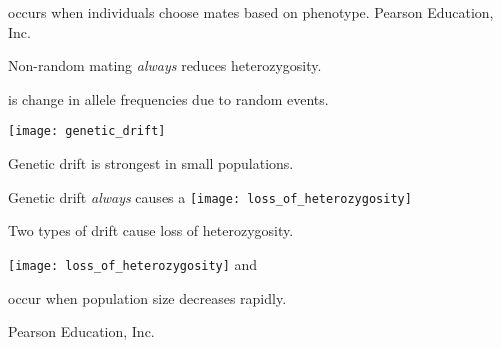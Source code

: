 \documentclass[t]{beamer}
\begin{document}
%
{
\begin{frame}[b]{ occurs when individuals choose mates based on phenotype.}
\hfill \tiny \textcopyright Pearson Education, Inc.
\end{frame}
}
%
{
\begin{frame}[b]{Non-random mating \emph{always} reduces heterozygosity.}
\end{frame}
}
%
\begin{frame}[t]{ is change in allele frequencies due to random events.}
	\vspace*{-\baselineskip}
	\begin{center}
		\texttt{[image: genetic\_drift]}
	\end{center}

	\vspace*{-\baselineskip}
	
	\hangpara Genetic drift is strongest in small populations.
	

\end{frame}
{
\begin{frame}{Genetic drift \emph{always} causes a }
	\texttt{[image: loss\_of\_heterozygosity]}
\end{frame}
}


{
\begin{frame}{Two types of drift cause  loss of heterozygosity.}

	\begin{multicols}{2}
		\texttt{[image: loss\_of\_heterozygosity]}
	\columnbreak
		\hangpara {} and\\ 
	\end{multicols}
	
\end{frame}
}
%
{
\begin{frame}[b]{ occur when population size decreases rapidly.}

\hfill \tiny \textcopyright Pearson Education, Inc.
\end{frame}
}
\end{document}
